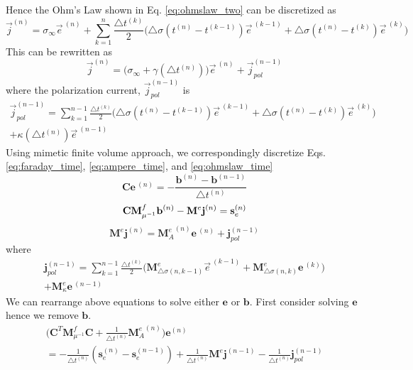 \documentclass[extra,mreferee]{gji}
\newcommand{\siginf}{\sigma_\infty}
\newcommand{\dsig}{\triangle\sigma}
\newcommand{\dcurl}{{\mathbf C}}
\newcommand{\M}{{\mathbf M}}
\newcommand{\MfMui}{{\M^f_{\mu^{-1}}}}
\newcommand{\Me}{{\M^e}}
\newcommand{\Mes}[1]{{\M^e_{#1}}}
\renewcommand {\j}  { {\vec j} }
\newcommand {\e}  { {\vec e} }
\renewcommand {\dj}  { {\mathbf{j} } }
\newcommand {\db}  { {\mathbf{b} } }
\newcommand {\de}  { {\mathbf{e} } }
\begin{document}
Hence the Ohm's Law shown in Eq. \ref{eq:ohmslaw_two} can be discretized as
\begin{equation}
  \j^{(n)} = \siginf \e^{\ (n)} +
  \sum_{k=1}^{n} \frac{\triangle t^{(k)}}{2} \Big(\dsig (t^{(n)} - t^{(k-1)}) \e^{\ (k-1)} + \dsig (t^{(n)} - t^{(k)}) \e^{\ (k)} \Big)
\end{equation}
This can be rewritten as
\begin{equation}
  \j^{(n)} = \Big(\siginf + \gamma (\triangle t^{(n)})\Big)\e^{\ (n)} + \j_{pol}^{(n-1)}
  \label{eq:ohmslaw_time}
\end{equation}
where the polarization current, $\j_{pol}^{(n-1)}$ is
\begin{align}
  \j_{pol}^{(n-1)} = \sum_{k=1}^{n-1} \frac{\triangle t^{(k)}}{2} \Big(\dsig (t^{(n)} - t^{(k-1)}) \e^{\ (k-1)} + \dsig (t^{(n)} - t^{(k)}) \e^{\ (k)} \Big) \nonumber \\
  +  \kappa(\triangle t^{(n)}) \e^{\ (n-1)}
\end{align}
Using mimetic finite volume approach, we correspondingly discretize Eqs. \ref{eq:faraday_time}, \ref{eq:ampere_time}, and \ref{eq:ohmslaw_time}
\begin{equation}
  \dcurl \de^{\ (n)} = -\frac{\db^{(n)}-\db^{(n-1)}}{\triangle t^{(n)}}
    \label{eq:faraday_discrete}
\end{equation}
\begin{equation}
  \dcurl \MfMui \db^{(n)} - \Me \dj^{(n)} = \mathbf{s}_e^{(n)} \\
  \label{eq:ampere_discrete}
\end{equation}
\begin{equation}
  \Me\dj^{(n)} = \Mes{A}^{(n)}\de^{\ (n)} + \dj_{pol}^{(n-1)}
  \label{eq:ohmslaw_discrete}
\end{equation}
where
\begin{align}
  \dj_{pol}^{(n-1)} = \sum_{k=1}^{n-1} \frac{\triangle t^{(k)}}{2} \Big(\Mes{\dsig (n, k-1)} \e^{\ (k-1)} + \Mes{\dsig (n, k)} \de^{\ (k)} \Big) \nonumber \\
  +  \Mes{\kappa} \de^{\ (n-1)}
\end{align}
We can rearrange above equations to solve either $\de$ or $\db$. First consider solving $\de$ hence we remove $\db$.
\begin{align}
  \Big(\dcurl^T \MfMui \dcurl + \frac{1}{\triangle t^{(n)}} \Mes{A}^{(n)}\Big) \de^{(n)} \nonumber \\
  = - \frac{1}{\triangle t^{(n)}} (\mathbf{s}_e^{(n)}-\mathbf{s}_e^{(n-1)})
    + \frac{1}{\triangle t^{(n)}} \Me \dj^{(n-1)} - \frac{1}{\triangle t^{(n)}} \dj_{pol}^{(n-1)}
\end{align}
\end{document}
